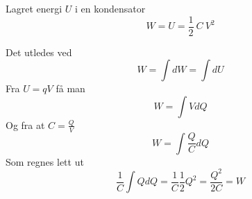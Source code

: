 Lagret energi $U$ i en kondensator
$$W = U = \frac{1}{2}\ C\ V^2$$

Det utledes ved
$$W = \int dW = \int dU$$
Fra $U = qV$ få man
$$W = \int V dQ$$
Og fra at $C=\frac{Q}{V}$
$$W = \int \frac{Q}{C} dQ$$
Som regnes lett ut
$$\frac{1}{C} \int Q dQ
  = \frac{1}{C} \frac{1}{2} Q^2
  = \frac{Q^2}{2C}
  = W$$
